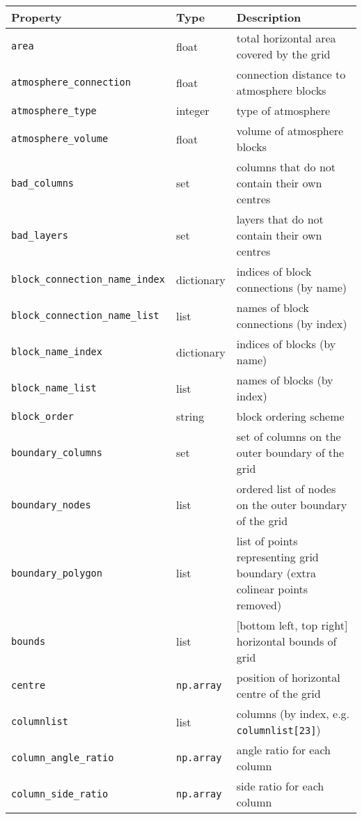 \begin{center}
  \begin{longtable}{|l|l|p{75mm}|}
    \hline
    \textbf{Property} & \textbf{Type} & \textbf{Description}\\
    \hline
    \texttt{area} & float & total horizontal area covered by the grid \\
    \texttt{atmosphere\_connection} & float & connection distance to atmosphere blocks\\
    \texttt{atmosphere\_type} & integer & type of atmosphere\\
    \texttt{atmosphere\_volume} & float & volume of atmosphere blocks\\
    \texttt{bad\_columns} & set & columns that do not contain their own centres\\
    \texttt{bad\_layers} & set & layers that do not contain their own centres\\
    \texttt{block\_connection\_name\_index} & dictionary & indices of block connections (by name)\\
    \texttt{block\_connection\_name\_list} & list & names of block connections (by index)\\
    \texttt{block\_name\_index} & dictionary & indices of blocks (by name)\\
    \texttt{block\_name\_list} & list & names of blocks (by index)\\
    \texttt{block\_order} & string & block ordering scheme\\
    \texttt{boundary\_columns} & set & set of columns on the outer boundary of the grid \\
    \texttt{boundary\_nodes} & list & ordered list of nodes on the outer boundary of the grid \\
    \texttt{boundary\_polygon} & list & list of points representing grid boundary (extra colinear points removed) \\
    \texttt{bounds} & list & [bottom left, top right] horizontal bounds of grid\\
    \texttt{centre} & \texttt{np.array} & position of horizontal centre of the grid \\
    \texttt{columnlist} & list & columns (by index, e.g. \texttt{columnlist[23]})\\
    \texttt{column\_angle\_ratio} & \texttt{np.array} & angle ratio for each column\\
    \texttt{column\_side\_ratio} & \texttt{np.array} & side ratio for each column\\

\end{longtable}
\end{center}
